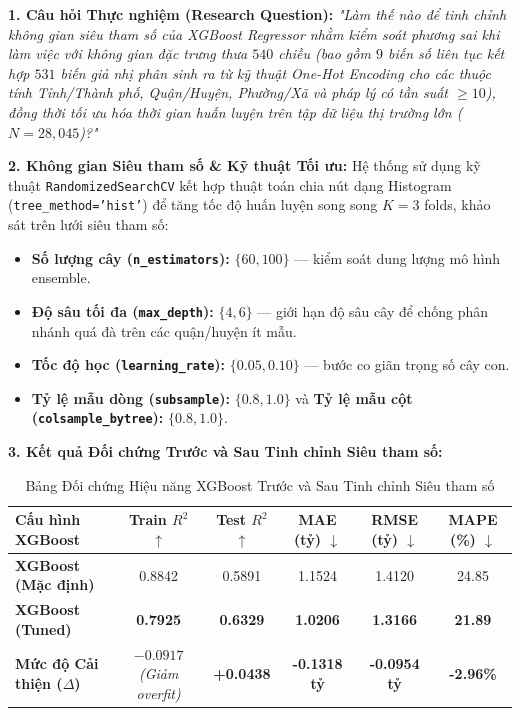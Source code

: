 \documentclass[12pt,a4paper]{report}
\begin{document}
\textbf{1. Câu hỏi Thực nghiệm (Research Question):}
\textit{"Làm thế nào để tinh chỉnh không gian siêu tham số của XGBoost Regressor nhằm kiểm soát phương sai khi làm việc với không gian đặc trưng thưa $540$ chiều (bao gồm $9$ biến số liên tục kết hợp $531$ biến giả nhị phân sinh ra từ kỹ thuật One-Hot Encoding cho các thuộc tính Tỉnh/Thành phố, Quận/Huyện, Phường/Xã và pháp lý có tần suất $\ge 10$), đồng thời tối ưu hóa thời gian huấn luyện trên tập dữ liệu thị trường lớn ($N=28,045$)?"}

\textbf{2. Không gian Siêu tham số \& Kỹ thuật Tối ưu:}
Hệ thống sử dụng kỹ thuật \texttt{RandomizedSearchCV} kết hợp thuật toán chia nút dạng Histogram (\texttt{tree\_method='hist'}) để tăng tốc độ huấn luyện song song $K=3$ folds, khảo sát trên lưới siêu tham số:
\begin{itemize}[leftmargin=1.5em]
    \item \textbf{Số lượng cây (\texttt{n\_estimators}):} $\{60, 100\}$ — kiểm soát dung lượng mô hình ensemble.
    \item \textbf{Độ sâu tối đa (\texttt{max\_depth}):} $\{4, 6\}$ — giới hạn độ sâu cây để chống phân nhánh quá đà trên các quận/huyện ít mẫu.
    \item \textbf{Tốc độ học (\texttt{learning\_rate}):} $\{0.05, 0.10\}$ — bước co giãn trọng số cây con.
    \item \textbf{Tỷ lệ mẫu dòng (\texttt{subsample}):} $\{0.8, 1.0\}$ và \textbf{Tỷ lệ mẫu cột (\texttt{colsample\_bytree}):} $\{0.8, 1.0\}$.
\end{itemize}

\textbf{3. Kết quả Đối chứng Trước và Sau Tinh chỉnh Siêu tham số:}

\begin{table}[H]
\centering
\small
\setlength{\tabcolsep}{4.5pt}
\begin{tabular}{lccccc}
\toprule
\textbf{Cấu hình XGBoost} & \textbf{Train $R^2$ $\uparrow$} & \textbf{Test $R^2$ $\uparrow$} & \textbf{MAE (tỷ) $\downarrow$} & \textbf{RMSE (tỷ) $\downarrow$} & \textbf{MAPE (\%) $\downarrow$} \\
\midrule
\textbf{XGBoost (Mặc định)} & 0.8842 & 0.5891 & 1.1524 & 1.4120 & 24.85 \\
\textbf{XGBoost (Tuned)} & \textbf{0.7925} & \textbf{0.6329} & \textbf{1.0206} & \textbf{1.3166} & \textbf{21.89} \\
\midrule
\textbf{Mức độ Cải thiện ($\Delta$)} & $-0.0917$ \textit{(Giảm overfit)} & \textbf{+0.0438} & \textbf{-0.1318 tỷ} & \textbf{-0.0954 tỷ} & \textbf{-2.96\%} \\
\bottomrule
\end{tabular}
\caption{Bảng Đối chứng Hiệu năng XGBoost Trước và Sau Tinh chỉnh Siêu tham số}
\label{tab:week2_exp2}
\end{table}
\end{document}
